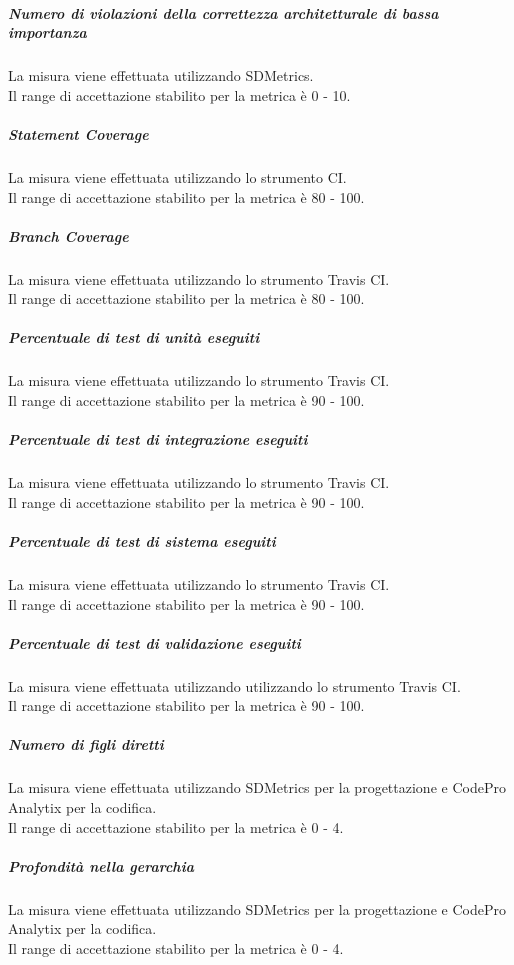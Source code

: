 			\subparagraph{Numero di violazioni della correttezza architetturale di bassa importanza}
			La misura viene effettuata utilizzando SDMetrics.
			\\Il range di accettazione stabilito per la metrica è 0 - 10.
			
			\subparagraph{Statement Coverage}
			La misura viene effettuata utilizzando lo strumento  CI.
			\\Il range di accettazione stabilito per la metrica è 80 - 100.
			
			\subparagraph{Branch Coverage}
			La misura viene effettuata utilizzando lo strumento Travis CI.
			\\Il range di accettazione stabilito per la metrica è 80 - 100.
			
			\subparagraph{Percentuale di test di unità eseguiti}
			La misura viene effettuata utilizzando lo strumento Travis CI.
			\\Il range di accettazione stabilito per la metrica è 90 - 100.
			
			\subparagraph{Percentuale di test di integrazione eseguiti}
			La misura viene effettuata utilizzando lo strumento Travis CI.
			\\Il range di accettazione stabilito per la metrica è 90 - 100.
			
			\subparagraph{Percentuale di test di sistema eseguiti}
			La misura viene effettuata utilizzando lo strumento Travis CI.
			\\Il range di accettazione stabilito per la metrica è 90 - 100.
			
			\subparagraph{Percentuale di test di validazione eseguiti}
			La misura viene effettuata utilizzando utilizzando lo strumento Travis CI.
			\\Il range di accettazione stabilito per la metrica è 90 - 100.
			
			\subparagraph{Numero di figli diretti}
			La misura viene effettuata utilizzando SDMetrics per la progettazione e CodePro Analytix per la codifica.
			\\Il range di accettazione stabilito per la metrica è 0 - 4.
			
			\subparagraph{Profondità nella gerarchia}
			La misura viene effettuata utilizzando SDMetrics per la progettazione e CodePro Analytix per la codifica.
			\\Il range di accettazione stabilito per la metrica è 0 - 4.

